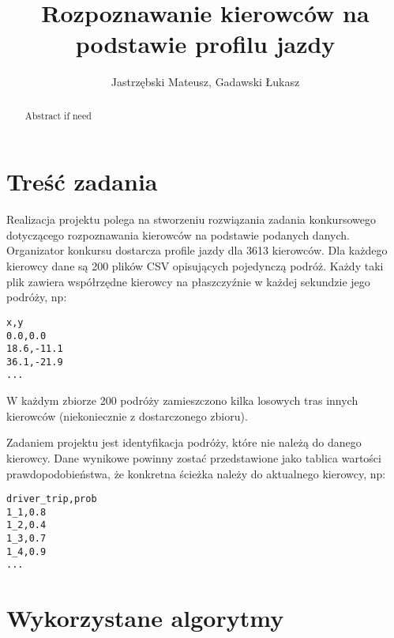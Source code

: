 \documentclass[]{scrartcl}
\title{Rozpoznawanie kierowców na podstawie profilu jazdy}
\author{Jastrzębski Mateusz, Gadawski Łukasz}
\begin{document}
\maketitle

\begin{abstract}
Abstract if need
\end{abstract}

\section{Treść zadania}
Realizacja projektu polega na stworzeniu rozwiązania zadania konkursowego dotyczącego rozpoznawania kierowców na podstawie podanych danych. Organizator konkursu dostarcza profile jazdy dla 3613 kierowców. Dla każdego kierowcy dane są 200 plików CSV opisujących pojedynczą podróż. Każdy taki plik zawiera współrzędne kierowcy na płaszczyźnie w każdej sekundzie jego podróży, np:
\begin{verbatim}
x,y
0.0,0.0
18.6,-11.1
36.1,-21.9
...
\end{verbatim}

W każdym zbiorze 200 podróży zamieszczono kilka losowych tras innych kierowców (niekoniecznie z dostarczonego zbioru).

Zadaniem projektu jest identyfikacja podróży, które nie należą do danego kierowcy. Dane wynikowe powinny zostać przedstawione jako tablica wartości prawdopodobieństwa, że konkretna ścieżka należy do aktualnego kierowcy, np:
\begin{verbatim}
driver_trip,prob
1_1,0.8
1_2,0.4
1_3,0.7
1_4,0.9
...
\end{verbatim}

\section{Wykorzystane algorytmy}
\end{document}
